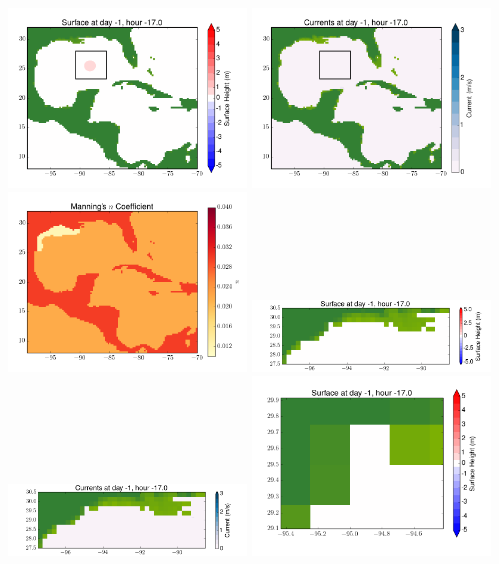\documentclass[11pt]{article}
\begin{document}
\vskip 10pt 
\includegraphics[width=0.475\textwidth]{frame0031fig1.png}
\includegraphics[width=0.475\textwidth]{frame0031fig2.png}
\vskip 10pt 
\includegraphics[width=0.475\textwidth]{frame0031fig3.png}
\includegraphics[width=0.475\textwidth]{frame0031fig4.png}
\vskip 10pt 
\includegraphics[width=0.475\textwidth]{frame0031fig5.png}
\includegraphics[width=0.475\textwidth]{frame0031fig6.png}
\end{document}
